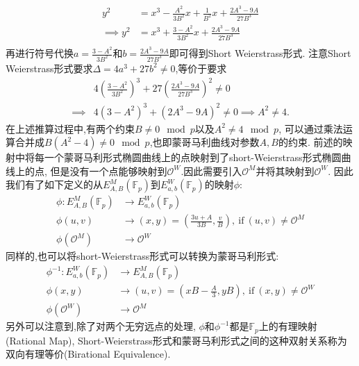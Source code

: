 \documentclass{article}
\newcommand{\F}{\mathbb{F}}
\begin{document}
\begin{equation*}
\begin{split}
y^2 & = x^3 - \frac{A^2}{3B^2}x + \frac{1}{B^2}x + \frac{2A^3 - 9A}{27B^3} \\
\implies 
y^2 & = x^3 + \frac{3-A^2}{3B^2} x + \frac{2A^3 - 9A}{27B^3} \\
\end{split}
\end{equation*}
再进行符号代换$a = \frac{3-A^2}{3B^2}$和$b = \frac{2A^3 - 9A}{27B^3}$即可得到Short Weierstrass形式.
注意Short Weierstrass形式要求$\Delta = 4a^3 + 27b^2 \neq 0$,等价于要求
\begin{equation*}
\begin{split}
& 4\left(\frac{3-A^2}{3B^2}\right)^3  + 27\left(  \frac{2A^3 - 9A}{27B^3} \right)^2  \neq 0 \\
\implies 
& 4\left(3-A^2\right)^3 + \left(  2A^3 - 9A \right)^2 \neq 0 \implies  A^2 \neq 4.
\end{split}
\end{equation*}
在上述推算过程中,有两个约束$B\neq 0\mod p$以及$A^2\neq 4\mod p$,
可以通过乘法运算合并成$B(A^2-4)\neq 0  \mod p$,也即蒙哥马利曲线对参数$A,B$的约束.
前述的映射中将每一个蒙哥马利形式椭圆曲线上的点映射到了short-Weierstrass形式椭圆曲线上的点,
但是没有一个点能够映射到$\mathcal{O}^W$.因此需要引入$\mathcal{O}^M$并将其映射到$\mathcal{O}^W$.
因此我们有了如下定义的从$E_{A,B}^M(\F_p)$到$E_{a,b}^{W}(\F_p)$的映射$\phi$:
\begin{equation*}
\begin{array}{rl}
\phi: E_{A,B}^M(\F_p) &  \rightarrow E_{a,b}^{W}(\F_p) \\
\phi(u,v)  & \rightarrow  (x,y) = \left( \frac{3u+A}{3B}, \frac{v}{B} \right),\ \text{if}\  (u,v)\neq \mathcal{O}^M \\
\phi(\mathcal{O}^M) &\rightarrow \mathcal{O}^W
\end{array}
\end{equation*}
同样的,也可以将short-Weierstrass形式可以转换为蒙哥马利形式:
\begin{equation*}
\begin{array}{rl}
\phi^{-1}: E_{a,b}^{W}(\F_p) &  \rightarrow  E_{A,B}^M(\F_p)\\
\phi(x, y)  & \rightarrow (u,v) = \left(xB - \frac{A}{3}, yB\right),\ \text{if}\  (x, y)\neq \mathcal{O}^W \\
\phi(\mathcal{O}^W) &\rightarrow \mathcal{O}^M
\end{array}
\end{equation*}
另外可以注意到,除了对两个无穷远点的处理, $\phi$和$\phi^{-1}$都是$\F_p$上的有理映射(Rational Map),
Short-Weierstrass形式和蒙哥马利形式之间的这种双射关系称为双向有理等价(Birational Equivalence).
\end{document}
